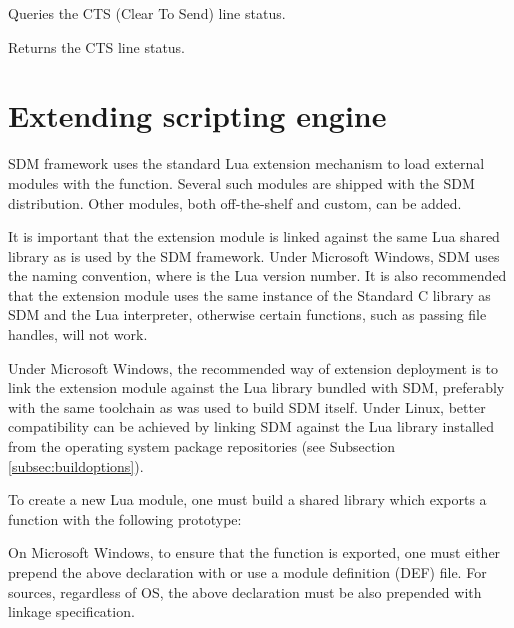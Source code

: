 \documentclass[a4paper,12pt,twoside,extrafontsizes]{memoir}
\begin{document}
\begin{funcdescr}
	Queries the CTS (Clear To Send) line status.
\end{funcdescr}

\begin{funcret}
	Returns the CTS line status.
\end{funcret}

\section{Extending scripting engine}
\label{sec:luaextensions}

SDM framework uses the standard Lua extension mechanism to load external modules with the  function. Several such modules are shipped with the SDM distribution. Other modules, both off-the-shelf and custom, can be added.

It is important that the extension module is linked against the same Lua shared library as is used by the SDM framework. Under Microsoft Windows, SDM uses the  naming convention, where  is the Lua version number. It is also recommended that the extension module uses the same instance of the Standard C library as SDM and the Lua interpreter, otherwise certain functions, such as passing file handles, will not work.

Under Microsoft Windows, the recommended way of extension deployment is to link the extension module against the Lua library bundled with SDM, preferably with the same toolchain as was used to build SDM itself. Under Linux, better compatibility can be achieved by linking SDM against the Lua library installed from the operating system package repositories (see Subsection \ref{subsec:buildoptions}).

To create a new Lua module, one must build a shared library which exports a  function with the following prototype:

\vspace{\baselineskip}
\vspace{\baselineskip}

On Microsoft Windows, to ensure that the function is exported, one must either prepend the above declaration with  or use a module definition (DEF) file. For \cplusplus{} sources, regardless of OS, the above declaration must be also prepended with  linkage specification.
\end{document}

